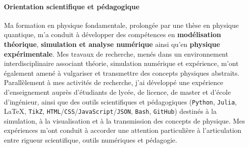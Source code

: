




\paragraph{Orientation scientifique et pédagogique}

Ma formation en physique fondamentale, prolongée par une thèse en physique
quantique, m’a conduit à développer des compétences en \textbf{modélisation
    théorique}, \textbf{simulation et analyse numérique} ainsi qu’en
\textbf{physique expérimentale}. Mes travaux de recherche, menés dans un
environnement interdisciplinaire associant théorie, simulation numérique et
expérience, m’ont également amené à vulgariser et transmettre des concepts
physiques abstraits. Parallèlement à mes activités de recherche, j’ai développé
une expérience d’enseignement auprès d’étudiants de lycée, de licence, de
master et d’école d’ingénieur, ainsi que des outils scientifiques et
pédagogiques (\texttt{Python}, \texttt{Julia}, \LaTeX{}, \texttt{TikZ},
\texttt{HTML}/\texttt{CSS}/\texttt{JavaScript}/\texttt{JSON}, \texttt{Bash},
\texttt{GitHub}) destinés à la simulation, à la visualisation et à la
transmission des concepts de physique. Mes expériences m’ont conduit à accorder
une attention particulière à l’articulation entre rigueur scientifique, outils
numériques et pédagogie.


